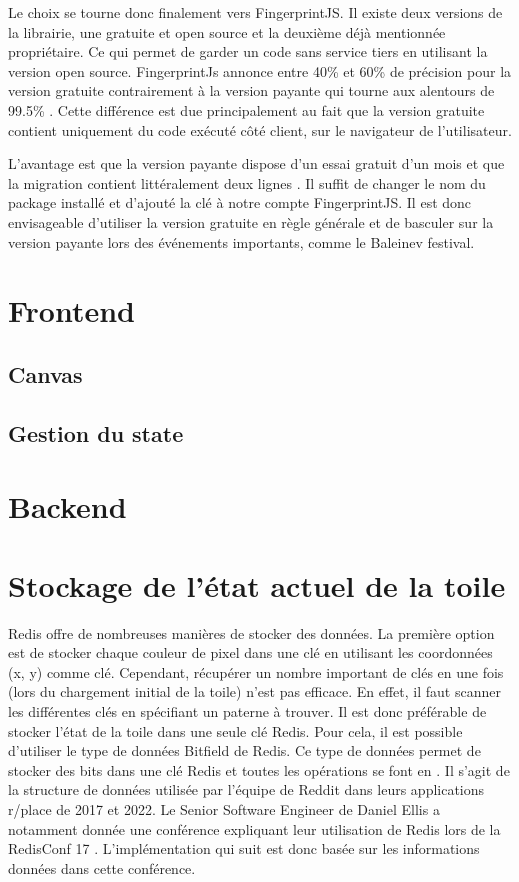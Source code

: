 Le choix se tourne donc finalement vers FingerprintJS. Il existe deux versions de la librairie, une gratuite et open source et la deuxième déjà mentionnée propriétaire. Ce qui permet de garder un code sans service tiers en utilisant la version open source. FingerprintJs annonce entre 40\% et 60\% de précision pour la version gratuite contrairement à la version payante qui tourne aux alentours de 99.5\% \cite{fingerprintjsrepo}. Cette différence est due principalement au fait que la version gratuite contient uniquement du code exécuté côté client, sur le navigateur de l'utilisateur.

L'avantage est que la version payante dispose d'un essai gratuit d'un mois et que la migration contient littéralement deux lignes \cite{migratefingerprintjs}. Il suffit de changer le nom du package installé et d'ajouté la clé à notre compte FingerprintJS. Il est donc envisageable d'utiliser la version gratuite en règle générale et de basculer sur la version payante lors des événements importants, comme le Baleinev festival.

\section{Frontend}

\subsection{Canvas}


\subsection{Gestion du state}

\section{Backend}


\section{Stockage de l'état actuel de la toile}
\label{section:stockage}

Redis offre de nombreuses manières de stocker des données. La première option est de stocker chaque couleur de pixel dans une clé en utilisant les coordonnées (x, y) comme clé. Cependant, récupérer un nombre important de clés en une fois (lors du chargement initial de la toile) n'est pas efficace. En effet, il faut scanner les différentes clés en spécifiant un paterne à trouver. Il est donc préférable de stocker l'état de la toile dans une seule clé Redis. Pour cela, il est possible d'utiliser le type de données Bitfield \cite{bitfield} de Redis. Ce type de données permet de stocker des bits dans une clé Redis et toutes les opérations se font en . Il s'agit de la structure de données utilisée par l'équipe de Reddit dans leurs applications r/place de 2017 et 2022. Le Senior Software Engineer de Daniel Ellis a notamment donnée une conférence expliquant leur utilisation de Redis lors de la RedisConf 17 \cite{redisconf}. L'implémentation qui suit est donc basée sur les informations données dans cette conférence.

